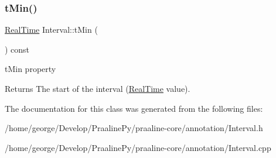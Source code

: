 \subsubsection{\texorpdfstring{t\+Min()}{tMin()}}
{\footnotesize\ttfamily \hyperlink{struct_real_time}{Real\+Time} Interval\+::t\+Min (\begin{DoxyParamCaption}{ }\end{DoxyParamCaption}) const\hspace{0.3cm}{\ttfamily [inline]}}



t\+Min property 

\begin{DoxyReturn}{Returns}
The start of the interval (\hyperlink{struct_real_time}{Real\+Time} value). 
\end{DoxyReturn}


The documentation for this class was generated from the following files\+:\begin{DoxyCompactItemize}
\item 
/home/george/\+Develop/\+Praaline\+Py/praaline-\/core/annotation/Interval.\+h\item 
/home/george/\+Develop/\+Praaline\+Py/praaline-\/core/annotation/Interval.\+cpp\end{DoxyCompactItemize}
